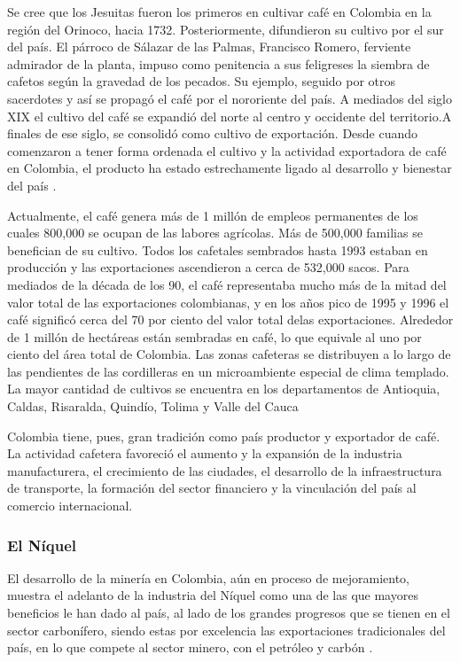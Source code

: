 Se cree que los Jesuitas fueron los primeros en cultivar café en Colombia en la región del Orinoco, hacia 1732. Posteriormente, difundieron su cultivo por el sur del país. El párroco de Sálazar de las Palmas, Francisco Romero, ferviente admirador de la planta, impuso como penitencia a sus feligreses la siembra de cafetos según la gravedad de los pecados. Su ejemplo, seguido por otros sacerdotes y así se propagó el café por el nororiente del país. A mediados del siglo XIX el cultivo del café se expandió del norte al centro y occidente del territorio.A finales de ese siglo, se consolidó como cultivo de exportación. Desde cuando comenzaron a tener forma ordenada el cultivo y la actividad exportadora de café en Colombia, el producto ha estado estrechamente ligado al desarrollo y bienestar del país \cite{cafeMain}.

Actualmente, el café genera más de 1 millón de empleos permanentes de los cuales 800,000 se ocupan de las labores agrícolas. Más de 500,000 familias se benefician de su cultivo. Todos los cafetales sembrados hasta 1993 estaban en producción y las exportaciones ascendieron a cerca de 532,000 sacos. Para mediados de la década de los 90, el café representaba mucho más de la mitad del valor total de las exportaciones colombianas, y en los años pico de 1995 y 1996 el café significó cerca del 70 por ciento del valor total delas exportaciones. Alrededor de 1 millón de hectáreas están sembradas en café, lo que equivale al uno por ciento del área total de Colombia. Las zonas cafeteras se distribuyen a lo largo de las pendientes de las cordilleras en un microambiente especial de clima templado. La mayor cantidad de cultivos se encuentra en los departamentos de Antioquia, Caldas, Risaralda, Quindío, Tolima y Valle del Cauca \cite{cafeMain}

Colombia tiene, pues, gran tradición como país productor y exportador de café. La actividad cafetera favoreció el aumento y la expansión de la industria manufacturera, el crecimiento de las ciudades, el desarrollo de la infraestructura de transporte, la formación del sector financiero y la vinculación del país al comercio internacional.

\subsubsection{El Níquel}
El  desarrollo  de  la  minería  en  Colombia, aún en proceso de mejoramiento, muestra el adelanto de la industria del Níquel como una de las que mayores beneficios le han dado  al  país,  al  lado  de  los  grandes  progresos que se tienen en el sector carbonífero, siendo estas por excelencia las exportaciones tradicionales del país, en lo que compete al sector minero, con el petróleo y carbón \cite{niquelMain}.

